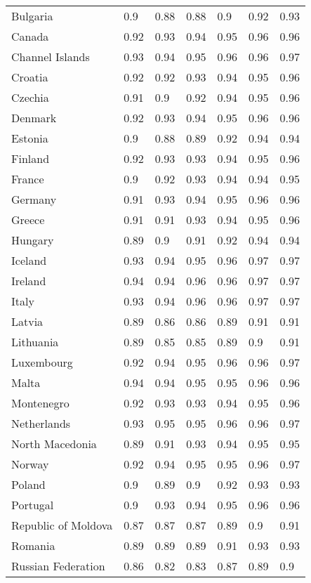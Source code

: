 \begin{longtable}[t]{lllllll}
Bulgaria & 0.9 & 0.88 & 0.88 & 0.9 & 0.92 & 0.93\\
Canada & 0.92 & 0.93 & 0.94 & 0.95 & 0.96 & 0.96\\
Channel Islands & 0.93 & 0.94 & 0.95 & 0.96 & 0.96 & 0.97\\
Croatia & 0.92 & 0.92 & 0.93 & 0.94 & 0.95 & 0.96\\
Czechia & 0.91 & 0.9 & 0.92 & 0.94 & 0.95 & 0.96\\
Denmark & 0.92 & 0.93 & 0.94 & 0.95 & 0.96 & 0.96\\
Estonia & 0.9 & 0.88 & 0.89 & 0.92 & 0.94 & 0.94\\
Finland & 0.92 & 0.93 & 0.93 & 0.94 & 0.95 & 0.96\\
France & 0.9 & 0.92 & 0.93 & 0.94 & 0.94 & 0.95\\
Germany & 0.91 & 0.93 & 0.94 & 0.95 & 0.96 & 0.96\\
Greece & 0.91 & 0.91 & 0.93 & 0.94 & 0.95 & 0.96\\
Hungary & 0.89 & 0.9 & 0.91 & 0.92 & 0.94 & 0.94\\
Iceland & 0.93 & 0.94 & 0.95 & 0.96 & 0.97 & 0.97\\
Ireland & 0.94 & 0.94 & 0.96 & 0.96 & 0.97 & 0.97\\
Italy & 0.93 & 0.94 & 0.96 & 0.96 & 0.97 & 0.97\\
Latvia & 0.89 & 0.86 & 0.86 & 0.89 & 0.91 & 0.91\\
Lithuania & 0.89 & 0.85 & 0.85 & 0.89 & 0.9 & 0.91\\
Luxembourg & 0.92 & 0.94 & 0.95 & 0.96 & 0.96 & 0.97\\
Malta & 0.94 & 0.94 & 0.95 & 0.95 & 0.96 & 0.96\\
Montenegro & 0.92 & 0.93 & 0.93 & 0.94 & 0.95 & 0.96\\
Netherlands & 0.93 & 0.95 & 0.95 & 0.96 & 0.96 & 0.97\\
North Macedonia & 0.89 & 0.91 & 0.93 & 0.94 & 0.95 & 0.95\\
Norway & 0.92 & 0.94 & 0.95 & 0.95 & 0.96 & 0.97\\
Poland & 0.9 & 0.89 & 0.9 & 0.92 & 0.93 & 0.93\\
Portugal & 0.9 & 0.93 & 0.94 & 0.95 & 0.96 & 0.96\\
Republic of Moldova & 0.87 & 0.87 & 0.87 & 0.89 & 0.9 & 0.91\\
Romania & 0.89 & 0.89 & 0.89 & 0.91 & 0.93 & 0.93\\
Russian Federation & 0.86 & 0.82 & 0.83 & 0.87 & 0.89 & 0.9\\

\end{longtable}
